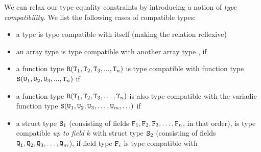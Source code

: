 We can relax our type equality constraints by introducing a notion of
\emph{type compatibility}. We list the following cases of compatible
types:
\begin{itemize}[--]
\item a type is type compatible with itself (making the relation
  reflexive)
\item an array type  is type compatible with another array
  type , if
\item a function type
  \(\texttt{R} (\texttt{T}_1, \texttt{T}_2, \texttt{T}_3, ..., \texttt{T}_n)\) is type
  compatible with function type
  \(\texttt{S} (\texttt{U}_1, \texttt{U}_2, \texttt{U}_3, ..., \texttt{T}_n)\)
  if
\item a function type
  \(\texttt{R} (\texttt{T}_1, \texttt{T}_2, \texttt{T}_3, \ldots, \texttt{T}_n)\) is also
  type compatible with the variadic function type
  \(\texttt{S} (\texttt{U}_1, \texttt{U}_2, \texttt{U}_3, \ldots, \texttt{U}_m, \ldots)\)
  if
\item a struct type \(\texttt{S}_1\) (consisting of fields
  \(\texttt{F}_1, \texttt{F}_2, \texttt{F}_3, \ldots, \texttt{F}_n\), in that order),
  is type compatible \emph{up to field} \(k\) with struct type
  \(\texttt{S}_2\) (consisting of fields
  \(\texttt{Q}_1, \texttt{Q}_2, \texttt{Q}_3, \ldots, \texttt{Q}_m\)),
  if field type \(\texttt{F}_i\) is type compatible with

\end{itemize}
